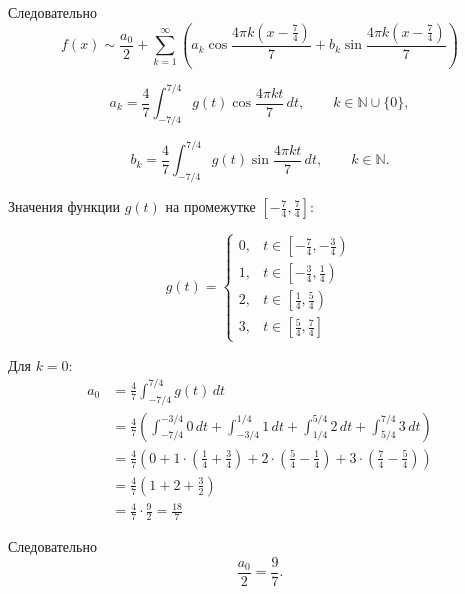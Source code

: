 \documentclass[12pt,a4paper]{article}
\begin{document}
Следовательно
\[
f(x)\sim \frac{a_0}{2} +
\sum_{k=1}^{\infty}
\left(
a_k\cos\frac{4\pi k\left(x-\frac74\right)}{7}
+
b_k\sin\frac{4\pi k\left(x-\frac74\right)}{7}
\right)
\]

\[
a_k=
\frac47
\int_{-7/4}^{7/4}
g(t)\cos\frac{4\pi kt}{7}\,dt,
\qquad k\in\mathbb N\cup\{0\},
\]

\[
b_k=
\frac47
\int_{-7/4}^{7/4}
g(t)\sin\frac{4\pi kt}{7}\,dt,
\qquad k\in\mathbb N.
\]

Значения функции \(g(t)\) на промежутке $\left[-\frac74,\frac74\right]$:

\[
g(t)=
\begin{cases}
0, & t\in\left[-\frac74,-\frac34\right) \\[2mm]
1, & t\in\left[-\frac34,\frac14\right) \\[2mm]
2, & t\in\left[\frac14,\frac54\right) \\[2mm]
3, & t\in\left[\frac54,\frac74\right]
\end{cases}
\]

Для \(k=0\):
\begin{align*}
a_0
&=
\frac47
\int_{-7/4}^{7/4}g(t)\,dt \\
&=
\frac47
\left(
\int_{-7/4}^{-3/4}0\,dt
+
\int_{-3/4}^{1/4}1\,dt
+
\int_{1/4}^{5/4}2\,dt
+
\int_{5/4}^{7/4}3\,dt
\right) \\
&=
\frac47
\left(
0
+
1\cdot\left(\frac14+\frac34\right)
+
2\cdot\left(\frac54-\frac14\right)
+
3\cdot\left(\frac74-\frac54\right)
\right) \\
&=
\frac47
\left(
1+2+\frac32
\right) \\
&=
\frac47\cdot\frac92
=
\frac{18}{7}
\end{align*}

Следовательно
\[
\frac{a_0}{2}=\frac97.
\]
\end{document}
